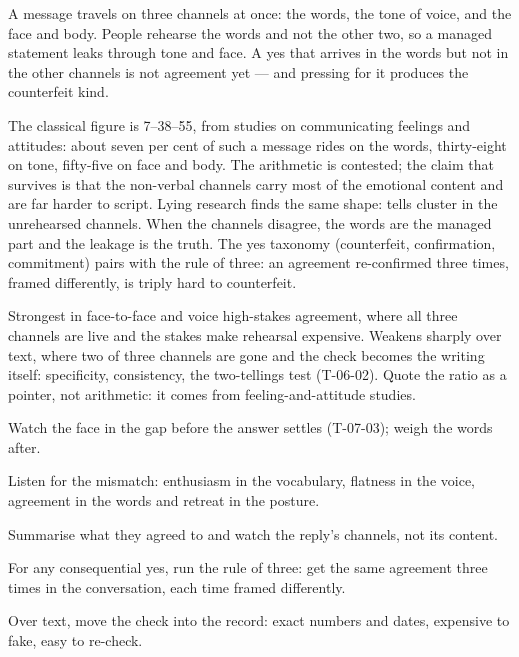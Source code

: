 \begin{core}
A message travels on three channels at once: the words, the tone of voice, and the face and body. People rehearse the words and not the other two, so a managed statement leaks through tone and face. A yes that arrives in the words but not in the other channels is not agreement yet --- and pressing for it produces the counterfeit kind.
\end{core}
\begin{mechanism}
The classical figure is 7--38--55, from studies on communicating feelings and attitudes: about seven per cent of such a message rides on the words, thirty-eight on tone, fifty-five on face and body. The arithmetic is contested; the claim that survives is that the non-verbal channels carry most of the emotional content and are far harder to script. Lying research finds the same shape: tells cluster in the unrehearsed channels. When the channels disagree, the words are the managed part and the leakage is the truth. The yes taxonomy (counterfeit, confirmation, commitment) pairs with the rule of three: an agreement re-confirmed three times, framed differently, is triply hard to counterfeit.
\end{mechanism}
\begin{conditions}
Strongest in face-to-face and voice high-stakes agreement, where all three channels are live and the stakes make rehearsal expensive. Weakens sharply over text, where two of three channels are gone and the check becomes the writing itself: specificity, consistency, the two-tellings test (T-06-02). Quote the ratio as a pointer, not arithmetic: it comes from feeling-and-attitude studies.
\end{conditions}
\begin{application}
  \item Watch the face in the gap before the answer settles (T-07-03); weigh the words after.
  \item Listen for the mismatch: enthusiasm in the vocabulary, flatness in the voice, agreement in the words and retreat in the posture.
  \item Summarise what they agreed to and watch the reply's channels, not its content.
  \item For any consequential yes, run the rule of three: get the same agreement three times in the conversation, each time framed differently.
  \item Over text, move the check into the record: exact numbers and dates, expensive to fake, easy to re-check.
\end{application}
